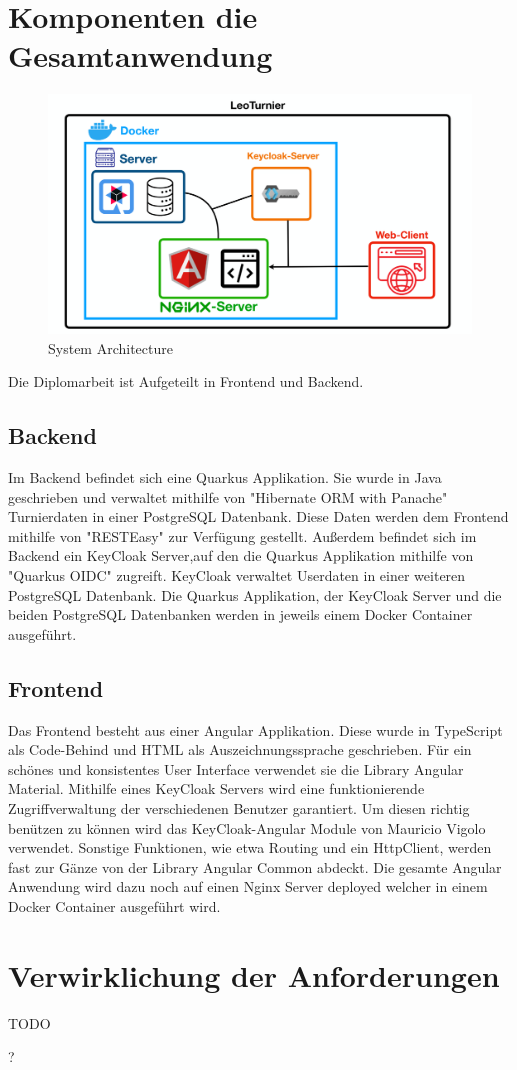 \section{Komponenten die Gesamtanwendung}

\begin{figure}[H]
    \includegraphics[scale=0.30]{pics/system_architecture_2.png}
    \caption{System Architecture}
\end{figure}

Die Diplomarbeit ist Aufgeteilt in Frontend und Backend. 

\subsection{Backend}

Im Backend befindet sich eine Quarkus Applikation. Sie wurde in Java geschrieben und verwaltet mithilfe von "Hibernate ORM with Panache" Turnierdaten in einer PostgreSQL Datenbank.
Diese Daten werden dem Frontend mithilfe von "RESTEasy" zur Verfügung gestellt. Außerdem befindet sich im Backend ein KeyCloak Server,auf den die Quarkus Applikation mithilfe von "Quarkus OIDC" zugreift. 
KeyCloak verwaltet Userdaten in einer weiteren PostgreSQL Datenbank. Die Quarkus Applikation, der KeyCloak Server und die beiden PostgreSQL Datenbanken werden in jeweils einem Docker Container ausgeführt.

\subsection{Frontend}

Das Frontend besteht aus einer Angular Applikation. Diese wurde in TypeScript als Code-Behind und HTML als Auszeichnungssprache geschrieben. Für ein schönes und konsistentes User Interface
verwendet sie die Library Angular Material. Mithilfe eines KeyCloak Servers wird eine funktionierende Zugriffverwaltung der verschiedenen Benutzer garantiert.
Um diesen richtig benützen zu können wird das KeyCloak-Angular Module von Mauricio Vigolo \cite{sysarch-keycloak-angular-1} verwendet. Sonstige Funktionen, wie etwa Routing und ein HttpClient, werden fast zur Gänze von der Library
Angular Common abdeckt.
Die gesamte Angular Anwendung wird dazu noch auf einen Nginx Server deployed welcher in einem Docker Container ausgeführt wird. 

\section{Verwirklichung der Anforderungen}

TODO

?